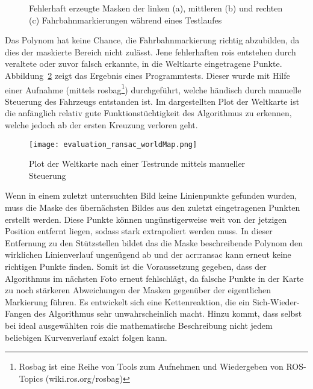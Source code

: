 \begin{figure}[H]
	\centering
	\quad
	\quad
	\caption{Fehlerhaft erzeugte Masken der linken (a), mittleren (b) und rechten (c) Fahrbahnmarkierungen während eines Testlaufes}
	\label{fig:fahrspurerkennung_ransac_ransac}
\end{figure} 

Das Polynom hat keine Chance, die Fahrbahnmarkierung richtig abzubilden, da dies der maskierte Bereich nicht zulässt. Jene fehlerhaften \glspl{roi} entstehen durch veraltete oder zuvor falsch erkannte, in die Weltkarte eingetragene Punkte. Abbildung~\ref{evaluation_ransac_weltkarte} zeigt das Ergebnis eines Programmtests. Dieser wurde mit Hilfe einer Aufnahme (mittels rosbag\footnote{Rosbag ist eine Reihe von Tools zum Aufnehmen und Wiedergeben von ROS-Topics (wiki.ros.org/rosbag)}) durchgeführt, welche händisch durch manuelle Steuerung des Fahrzeugs entstanden ist. Im dargestellten Plot der Weltkarte ist die anfänglich relativ gute Funktionstüchtigkeit des Algorithmus zu erkennen, welche jedoch ab der ersten Kreuzung verloren geht.

\begin{figure}[H] %
	\centering
	\texttt{[image: evaluation\_ransac\_worldMap.png]}
	\caption{Plot der Weltkarte nach einer Testrunde mittels manueller Steuerung}
	\label{evaluation_ransac_weltkarte}
\end{figure} 

Wenn in einem zuletzt untersuchten Bild keine Linienpunkte gefunden wurden, muss die Maske des übernächsten Bildes aus den zuletzt eingetragenen Punkten erstellt werden. Diese Punkte können ungünstigerweise weit von der jetzigen Position entfernt liegen, sodass stark extrapoliert werden muss. In dieser Entfernung zu den Stützstellen bildet das die Maske beschreibende Polynom den wirklichen Linienverlauf ungenügend ab und der \gls{acr:ransac} kann erneut keine richtigen Punkte finden. Somit ist die Voraussetzung gegeben, dass der Algorithmus im nächsten Foto erneut fehlschlägt, da falsche Punkte in der Karte zu noch stärkeren Abweichungen der Masken gegenüber der eigentlichen Markierung führen. Es entwickelt sich eine Kettenreaktion, die ein \glqq Sich-Wieder-Fangen\grqq{} des Algorithmus sehr unwahrscheinlich macht. 
Hinzu kommt, dass selbst bei ideal ausgewählten \glspl{roi} die mathematische Beschreibung nicht jedem beliebigen Kurvenverlauf exakt folgen kann. 


